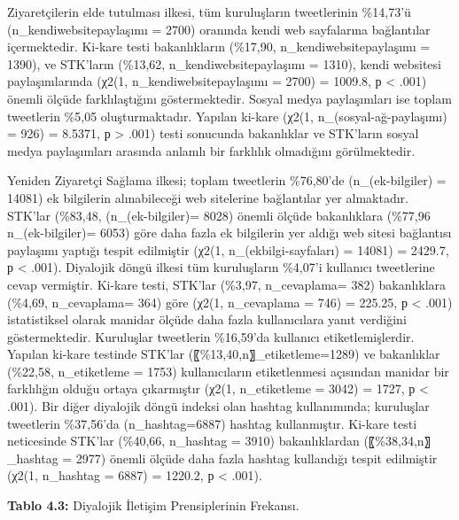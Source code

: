 \documentclass[
]{book}
\begin{document}
Ziyaretçilerin elde tutulması ilkesi, tüm kuruluşların tweetlerinin \%14,73'ü (n\_kendiwebsitepaylaşımı = 2700) oranında kendi web sayfalarına bağlantılar içermektedir. Ki-kare testi bakanlıkların (\%17,90, n\_kendiwebsitepaylaşımı = 1390), ve STK'ların (\%13,62, n\_kendiwebsitepaylaşımı = 1310), kendi websitesi paylaşımlarında (χ2(1, n\_kendiwebsitepaylaşımı = 2700) = 1009.8, р \textless{} .001) önemli ölçüde farklılaştığını göstermektedir. Sosyal medya paylaşımları ise toplam tweetlerin \%5,05 oluşturmaktadır. Yapılan ki-kare (χ2(1, n\_(sosyal-ağ-paylaşımı) = 926) = 8.5371, р \textgreater{} .001) testi sonucunda bakanlıklar ve STK'ların sosyal medya paylaşımları arasında anlamlı bir farklılık olmadığını görülmektedir.

Yeniden Ziyaretçi Sağlama ilkesi; toplam tweetlerin \%76,80'de (n\_(ek-bilgiler) = 14081) ek bilgilerin alınabileceği web sitelerine bağlantılar yer almaktadır. STK'lar (\%83,48, (n\_(ek-bilgiler)= 8028) önemli ölçüde bakanlıklara (\%77,96 n\_(ek-bilgiler)= 6053) göre daha fazla ek bilgilerin yer aldığı web sitesi bağlantısı paylaşımı yaptığı tespit edilmiştir (χ2(1, n\_(ekbilgi-sayfaları) = 14081) = 2429.7, р \textless{} .001).
Diyalojik döngü ilkesi tüm kuruluşların \%4,07'i kullanıcı tweetlerine cevap vermiştir. Ki-kare testi, STK'lar (\%3,97, n\_cevaplama= 382) bakanlıklara (\%4,69, n\_cevaplama= 364) göre (χ2(1, n\_cevaplama = 746) = 225.25, р \textless{} .001) istatistiksel olarak manidar ölçüde daha fazla kullanıcılara yanıt verdiğini göstermektedir. Kuruluşlar tweetlerin \%16,59'da kullanıcı etiketlemişlerdir. Yapılan ki-kare testinde STK'lar (〖\%13,40,n〗\_etiketleme=1289) ve bakanlıklar (\%22,58, n\_etiketleme = 1753) kullanıcıların etiketlenmesi açısından manidar bir farklılığın olduğu ortaya çıkarmıştır (χ2(1, n\_etiketleme = 3042) = 1727, р \textless{} .001). Bir diğer diyalojik döngü indeksi olan hashtag kullanımında; kuruluşlar tweetlerin \%37,56'da (n\_hashtag=6887) hashtag kullanmıştır. Ki-kare testi neticesinde STK'lar (\%40,66, n\_hashtag = 3910) bakanlıklardan (〖\%38,34,n〗\_hashtag = 2977) önemli ölçüde daha fazla hashtag kullandığı tespit edilmiştir (χ2(1, n\_hashtag = 6887) = 1220.2, р \textless{} .001).

\textbf{Tablo 4.3:} Diyalojik İletişim Prensiplerinin Frekansı.
\end{document}

